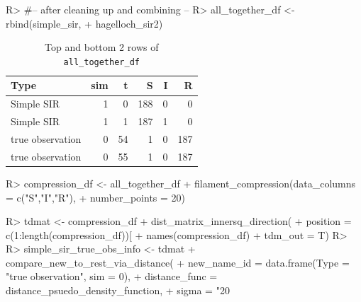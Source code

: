 \documentclass[
  shortnames]{jss}
\begin{document}
\begin{CodeChunk}
\begin{CodeInput}
R> #-- after cleaning up and combining --
R> all_together_df <- rbind(simple_sir,
+                          hagelloch_sir2)
\end{CodeInput}
\end{CodeChunk}

\begin{CodeChunk}
\begin{table}[!h]

\caption{\label{tab:cif-all-together-df}Top and bottom 2 rows of \tt{all\_together\_df}}
\centering
\begin{tabular}[t]{lrrrrr}
\toprule
Type & sim & t & S & I & R\\
\midrule
Simple SIR & 1 & 0 & 188 & 0 & 0\\
Simple SIR & 1 & 1 & 187 & 1 & 0\\
true observation & 0 & 54 & 1 & 0 & 187\\
true observation & 0 & 55 & 1 & 0 & 187\\
\bottomrule
\end{tabular}
\end{table}

\end{CodeChunk}

\begin{CodeChunk}
\begin{CodeInput}
R> compression_df <- all_together_df %
+   filament_compression(data_columns = c("S","I","R"), 
+                        number_points = 20)
\end{CodeInput}
\end{CodeChunk}

\begin{CodeChunk}
\begin{CodeInput}
R> tdmat <- compression_df %
+   dist_matrix_innersq_direction(
+     position = c(1:length(compression_df))[
+       names(compression_df) %
+     tdm_out = T)
R> 
R> simple_sir_true_obs_info <- tdmat %
+   compare_new_to_rest_via_distance(
+     new_name_id = data.frame(Type = "true observation", sim = 0),
+     distance_func = distance_psuedo_density_function, 
+     sigma = "20%
\end{CodeInput}
\end{CodeChunk}
\end{document}
